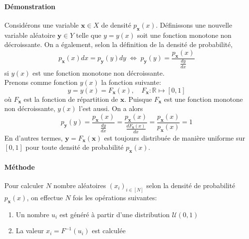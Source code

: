 \documentclass[a4paper]{article}
\begin{document}
\paragraph{Démonstration}
Considérons une variable \(\mathbf x\in X\) de densité
\(p_{\mathbf x}(x)\). Définissons une nouvelle variable aléatoire
\(\mathbf y\in Y\) telle que \(y=y(x)\) soit une fonction monotone non
décroissante. On a également, selon la définition de la densité de
probabilité,
\[
	p_{\mathbf x}(x)dx=p_{\mathbf y}(y)dy \;\Leftrightarrow\;
	p_{\mathbf y}(y) = \frac{p_{\mathbf x}(x)}{\frac{dy}{dx}}
\]
si \(y(x)\) est une fonction monotone non décroissante.\\
Prenons comme fonction \(y(x)\) la fonction suivante:
\[y=y(x)=F_{\mathbf x}(x),\quad F_{\mathbf x}:\mathbb{R}\mapsto[0,1]\]
où \(F_{\mathbf x}\) est la fonction de répartition de \(\mathbf x\).
Puisque \(F_{\mathbf x}\) est une fonction monotone non décroissante,
\(y(x)\) l'est aussi.
On a alors
\[
	p_{\mathbf y}(y) = \frac{p_{\mathbf x}(x)}{\frac{dy}{dx}}=
	\frac{p_{\mathbf x}(x)}{\frac{dF_{\mathbf x}(x)}{dx}}=
	\frac{p_{\mathbf x}(x)}{p_{\mathbf x}(x)}=1
\]
En d'autres termes, \(\mathbf y=F_{\mathbf x}(\mathbf x)\) est toujours
distribuée de manière uniforme sur \([0,1]\) pour toute densité de
probabilité \(p_{\mathbf x}(x)\).
\paragraph{Méthode} Pour calculer \(N\) nombre aléatoires
\((x_i)_{i\in[N]}\) selon la densité de probabilité \(p_{\mathbf x}(x)\),
on effectue \(N\) fois les opérations suivantes:
\begin{enumerate}
	\item Un nombre \(u_i\) est généré à partir d'une distribution
		\(\mathcal U(0,1)\)
	\item La valeur \(x_i=F^{-1}(u_i)\) est calculée
\end{enumerate}
\end{document}
